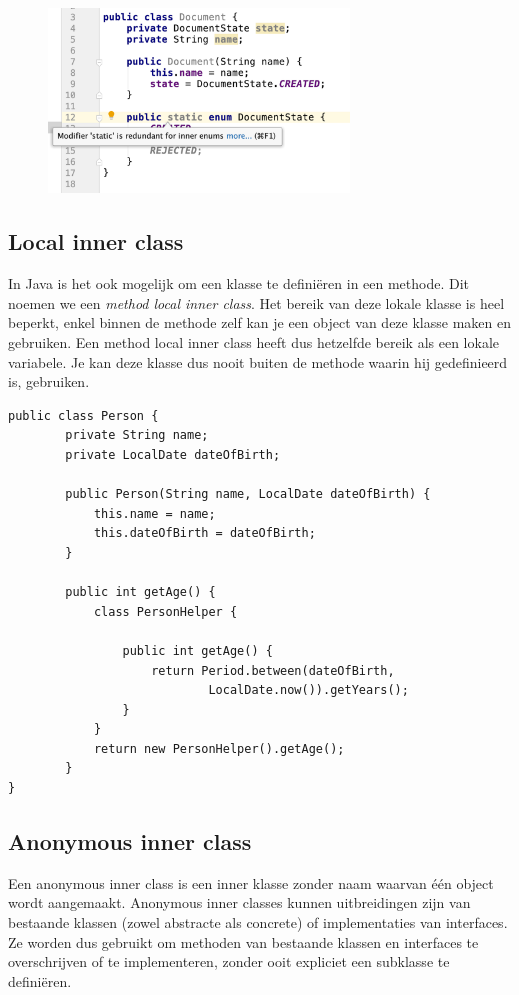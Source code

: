 \documentclass{tstextbook}
\begin{document}
\begin{figure}[H]
  \includegraphics[width=8cm]{images/h5/nested_enum.png}
  \label{fig:nested_enum}
\end{figure}

\subsection{Local inner class}

In Java is het ook mogelijk om een klasse te defini\"eren in een methode. Dit noemen we een \textit{method local inner class}. Het bereik van deze lokale klasse is heel beperkt, enkel binnen de methode zelf kan je een object van deze klasse maken en gebruiken. Een method local inner class heeft dus hetzelfde bereik als een lokale variabele.
Je kan deze klasse dus nooit buiten de methode waarin hij gedefinieerd is, gebruiken.

\begin{lstlisting}
public class Person {
		private String name;
		private LocalDate dateOfBirth;

		public Person(String name, LocalDate dateOfBirth) {
			this.name = name;
			this.dateOfBirth = dateOfBirth;
		}

		public int getAge() {
			class PersonHelper {

				public int getAge() {
					return Period.between(dateOfBirth,
							LocalDate.now()).getYears();
				}
			}
			return new PersonHelper().getAge();
		}
}
\end{lstlisting}



\subsection{Anonymous inner class}

Een anonymous inner class is een inner klasse zonder naam waarvan  \'e\'en object wordt aangemaakt. Anonymous inner classes kunnen uitbreidingen zijn van bestaande klassen (zowel abstracte als concrete) of implementaties van interfaces. Ze worden dus gebruikt om methoden van bestaande klassen en interfaces te overschrijven of te implementeren, zonder ooit expliciet een subklasse te defini\"eren.  
\end{document}
